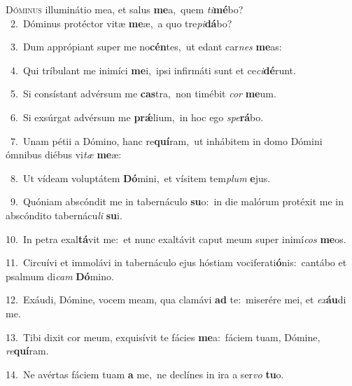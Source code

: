 \lettrine{\initial\textcolor{\initialcolor}{D}}{óminus} illuminátio mea, et salus \textbf{me}\-a,~\star quem \textit{ti}\-\textbf{mé}bo?\\
{\numbfont\textcolor{\numbcolor}{~2.}}~Dóminus protéctor vitæ \textbf{me}\-æ,~\star a quo tre\-\textit{pi}\-\textbf{dá}bo?\par
{\numbfont\textcolor{\numbcolor}{~3.}}~Dum apprópiant super me no\-\textbf{cén}\-tes,~\star ut edant car\textit{nes} \textbf{me}\-as:\par
{\numbfont\textcolor{\numbcolor}{~4.}}~Qui tríbulant me inimíci \textbf{me}\-i,~\star ipsi infirmáti sunt et ce\-\textit{ci}\-\textbf{dé}runt.\par
{\numbfont\textcolor{\numbcolor}{~5.}}~Si consístant advérsum me \textbf{cas}\-tra,~\star non timébit \textit{cor} \textbf{me}\-um.\par
{\numbfont\textcolor{\numbcolor}{~6.}}~Si exsúrgat advérsum me \textbf{prǽ}\-lium,~\star in hoc ego \textit{spe}\-\textbf{rá}bo.\par
{\numbfont\textcolor{\numbcolor}{~7.}}~Unam pétii a Dómino, hanc re\-\textbf{quí}\-ram,~\star ut inhábitem in domo Dómini ómnibus diébus vi\textit{tæ} \textbf{me}\-æ:\par
{\numbfont\textcolor{\numbcolor}{~8.}}~Ut vídeam voluptátem \textbf{Dó}\-mini,~\star et vísitem tem\textit{plum} \textbf{e}\-jus.\par
{\numbfont\textcolor{\numbcolor}{~9.}}~Quóniam abscóndit me in tabernáculo \textbf{su}\-o:~\star in die malórum protéxit me in abscóndito tabernácu\textit{li} \textbf{su}\-i.\par
{\numbfont\textcolor{\numbcolor}{10.}}~In petra exal\-\textbf{tá}\-vit me:~\star et nunc exaltávit caput meum super inimí\textit{cos} \textbf{me}\-os.\par
{\numbfont\textcolor{\numbcolor}{11.}}~Circuívi et immolávi in tabernáculo ejus hóstiam vociferati\-\textbf{ó}\-nis:~\star cantábo et psalmum di\textit{cam} \textbf{Dó}\-mino.\par
{\numbfont\textcolor{\numbcolor}{12.}}~Exáudi, Dómine, vocem meam, qua clamávi \textbf{ad} te:~\star miserére mei, et \textit{ex}\-\textbf{áu}di me.\par
{\numbfont\textcolor{\numbcolor}{13.}}~Tibi dixit cor meum, exquisívit te fácies \textbf{me}\-a:~\star fáciem tuam, Dómine, \textit{re}\-\textbf{quí}ram.\par
{\numbfont\textcolor{\numbcolor}{14.}}~Ne avértas fáciem tuam \textbf{a} me,~\star ne declínes in ira a ser\textit{vo} \textbf{tu}\-o.\par
